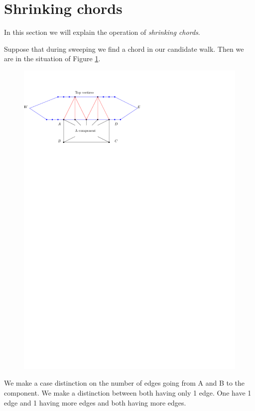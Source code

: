 
\section{Shrinking chords}
In this section we will explain the operation of \emph{shrinking chords}.


Suppose that during sweeping we find a chord  in our candidate walk. Then we are in the situation of Figure \ref{fig:chord:situation}.

\begin{figure}[h]
  \centering
  \includegraphics[scale=1]{chordShrink/img/situation}
  \caption{}
  \label{fig:chord:situation}
\end{figure}

We make a case distinction on the number of edges going from A and B to the component. We make a distinction between both having only 1 edge. One have 1 edge and 1 having more edges and both having more edges.


